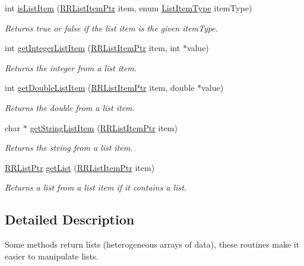\begin{DoxyCompactItemize}
int \hyperlink{group__list_ga7de82b1f908fc343be8b3c1acc5ff8ce}{is\+List\+Item} (\hyperlink{rrc__types_8h_a79938364b69256c42480bb3a29ebf73e}{R\+R\+List\+Item\+Ptr} item, enum \hyperlink{rrc__types_8h_ab99437ab2e88aa90b7ebb8add042b25e}{List\+Item\+Type} item\+Type)
\begin{DoxyCompactList}\small\item\em Returns true or false if the list item is the given item\+Type. \end{DoxyCompactList}\item 
int \hyperlink{group__list_gac6c755f8deb6b352d08a9d7f2fcef287}{get\+Integer\+List\+Item} (\hyperlink{rrc__types_8h_a79938364b69256c42480bb3a29ebf73e}{R\+R\+List\+Item\+Ptr} item, int $\ast$value)
\begin{DoxyCompactList}\small\item\em Returns the integer from a list item. \end{DoxyCompactList}\item 
int \hyperlink{group__list_gaa1829f0fb1dd66109ec8821538974713}{get\+Double\+List\+Item} (\hyperlink{rrc__types_8h_a79938364b69256c42480bb3a29ebf73e}{R\+R\+List\+Item\+Ptr} item, double $\ast$value)
\begin{DoxyCompactList}\small\item\em Returns the double from a list item. \end{DoxyCompactList}\item 
char $\ast$ \hyperlink{group__list_ga0af9b5f54fcb61b43650cc756d5d8773}{get\+String\+List\+Item} (\hyperlink{rrc__types_8h_a79938364b69256c42480bb3a29ebf73e}{R\+R\+List\+Item\+Ptr} item)
\begin{DoxyCompactList}\small\item\em Returns the string from a list item. \end{DoxyCompactList}\item 
\hyperlink{rrc__types_8h_a32a8a60ac06858ff3a791672bd2bec73}{R\+R\+List\+Ptr} \hyperlink{group__list_ga062c416b761b13200f28830cf64e3b6c}{get\+List} (\hyperlink{rrc__types_8h_a79938364b69256c42480bb3a29ebf73e}{R\+R\+List\+Item\+Ptr} item)
\begin{DoxyCompactList}\small\item\em Returns a list from a list item if it contains a list. \end{DoxyCompactList}\end{DoxyCompactItemize}


\subsection{Detailed Description}
Some methods return lists (heterogeneous arrays of data), these routines make it easier to manipulate lists. 



